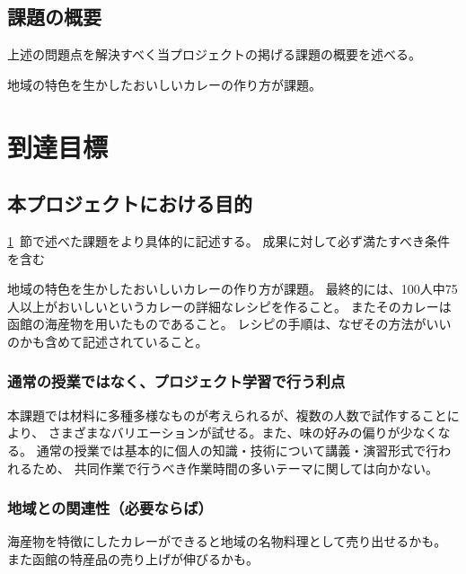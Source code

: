 \documentclass[openany,11pt,papersize]{jsbook}
\begin{document}
\section{課題の概要}\label{sec:gaiyou}
\begin{hissu}
 上述の問題点を解決すべく当プロジェクトの掲げる課題の概要を述べる。
\end{hissu}
地域の特色を生かしたおいしいカレーの作り方が課題。




\chapter{到達目標}

\section{本プロジェクトにおける目的}\label{sec:mokuteki}
\begin{hissu}
\ref{sec:gaiyou}~節で述べた課題をより具体的に記述する。
成果に対して必ず満たすべき条件を含む
\end{hissu}

地域の特色を生かしたおいしいカレーの作り方が課題。
最終的には、100人中75人以上がおいしいというカレーの詳細なレシピを作ること。
またそのカレーは函館の海産物を用いたものであること。
レシピの手順は、なぜその方法がいいのかも含めて記述されていること。

\subsection{通常の授業ではなく、プロジェクト学習で行う利点}

本課題では材料に多種多様なものが考えられるが、複数の人数で試作することにより、
さまざまなバリエーションが試せる。また、味の好みの偏りが少なくなる。
通常の授業では基本的に個人の知識・技術について講義・演習形式で行われるため、
共同作業で行うべき作業時間の多いテーマに関しては向かない。


\subsection{地域との関連性（必要ならば）}

海産物を特徴にしたカレーができると地域の名物料理として売り出せるかも。
また函館の特産品の売り上げが伸びるかも。

\end{document}

